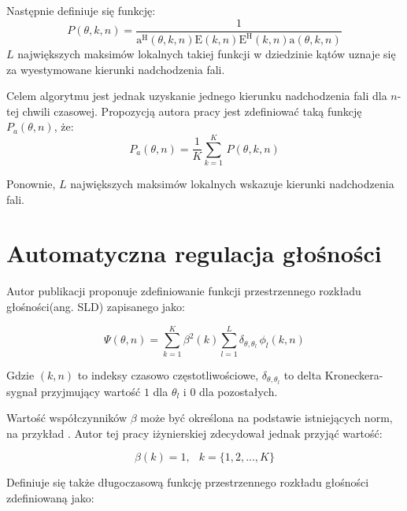 \noindent Następnie definiuje się funkcję:
\begin{equation}
    \label{equation:P}
    P(\theta,k,n)=
    \dfrac{1}{
    \bm{\mathrm{a}}^{\mathrm{H}}(\theta,k,n)
    \bm{\mathrm{E}}(k,n)
    \bm{\mathrm{E}}^{\mathrm{H}}(k,n)
    \bm{\mathrm{a}}(\theta,k,n)
    }
\end{equation}
\noindent 
$L$ największych maksimów lokalnych takiej funkcji w dziedzinie kątów uznaje się za wyestymowane kierunki nadchodzenia fali.

\noindent Celem algorytmu jest jednak uzyskanie jednego kierunku nadchodzenia fali dla $n$-tej chwili czasowej. Propozycją autora pracy jest zdefiniować taką funkcję $P_{a}(\theta,n)$, że:
\begin{equation}
    \label{equation:Pa}
    P_{a}(\theta,n) = 
    \dfrac{1}{K}\sum_{k=1}^{K}\,P(\theta,k,n)   
\end{equation}

\noindent Ponownie, $L$ największych maksimów lokalnych wskazuje kierunki nadchodzenia fali.

\newpage
\section{Automatyczna regulacja głośności}

Autor publikacji \cite{Braun2014} proponuje zdefiniowanie funkcji przestrzennego rozkładu głośności(ang. SLD) zapisanego jako:

\begin{equation}
    \label{equation:SLD}
    \Psi(\theta,n)=
    \sum_{k=1}^{K} \beta^{2}(k)
    \sum_{l=1}^{L}\delta_{\theta,\theta_{l}}
    \, \phi_{l}(k,n)
\end{equation}

Gdzie $(k,n)$ to indeksy czasowo częstotliwościowe, $\delta_{\theta,\theta_{l}}$ to delta Kroneckera- sygnał przyjmujący wartość $1$ dla $\theta_{l}$ i $0$ dla pozostałych.


\noindent Wartość współczynników $\beta$ może być określona na podstawie istniejących norm, na przykład \cite{coef}. Autor tej pracy iżynierskiej zdecydował jednak przyjąć wartość:

\begin{equation}
    \label{equation:beta}
    \beta(k) = 1, \,\,\,\ k=\{1,2,...,K\}
\end{equation}

Definiuje się także długoczasową funkcję przestrzennego rozkładu głośności zdefiniowaną jako:

